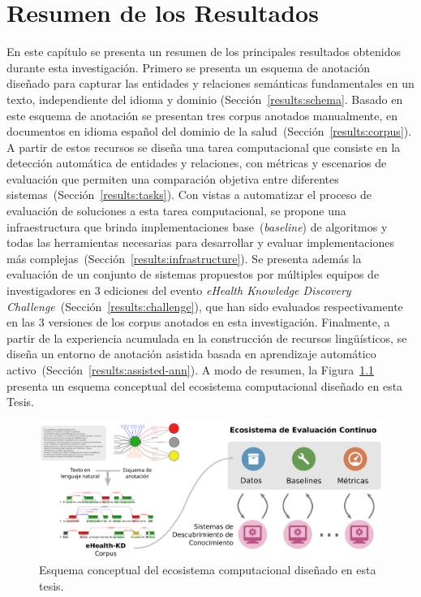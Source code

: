 \chapter{Resumen de los Resultados}\label{Chap:Results}

En este capítulo se presenta un resumen de los principales resultados obtenidos durante esta investigación.
Primero se presenta un esquema de anotación diseñado para capturar las entidades y relaciones semánticas fundamentales en un texto, independiente del idioma y dominio (Sección~\ref{results:schema}.
Basado en este esquema de anotación se presentan tres corpus anotados manualmente, en documentos en idioma español del dominio de la salud~(Sección~\ref{results:corpus}).
A partir de estos recursos se diseña una tarea computacional que consiste en la detección automática de entidades y relaciones, con métricas y escenarios de evaluación que permiten una comparación objetiva entre diferentes sistemas~(Sección~\ref{results:tasks}).
Con vistas a automatizar el proceso de evaluación de soluciones a esta tarea computacional, se propone una infraestructura que brinda implementaciones base~(\textit{baseline}) de algoritmos y todas las herramientas necesarias para desarrollar y evaluar implementaciones más complejas~(Sección~\ref{results:infrastructure}).
Se presenta además la evaluación de un conjunto de sistemas propuestos por múltiples equipos de investigadores en 3 ediciones del evento \textit{eHealth Knowledge Discovery Challenge}~(Sección~\ref{results:challenge}), que han sido evaluados respectivamente en las 3 versiones de los corpus anotados en esta investigación.
Finalmente, a partir de la experiencia acumulada en la construcción de recursos lingüísticos, se diseña un entorno de anotación asistida basada en aprendizaje automático activo~(Sección~\ref{results:assisted-ann}).
A modo de resumen, la Figura~\ref{fig:conceptualmap} presenta un esquema conceptual del ecosistema computacional diseñado en esta Tesis.

\begin{figure}
    \centering
    \includegraphics[width=\textwidth]{Images/Chapters/graphical-abstract.pdf}
    \caption{Esquema conceptual del ecosistema computacional diseñado en esta tesis.}
    \label{fig:conceptualmap}
\end{figure}

